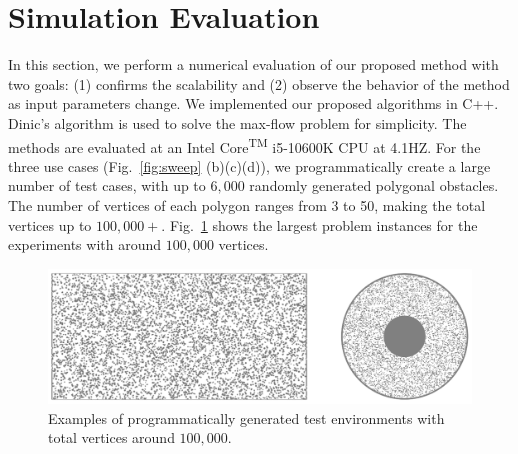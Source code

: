 \section{Simulation Evaluation}
In this section, we perform a numerical evaluation of our proposed method
with two goals: (1) confirms the scalability and (2) observe the behavior 
of the method as input parameters change. 
%
We implemented our proposed algorithms in C++. Dinic's algorithm is used to solve the max-flow problem \cite{dinitz1970algorithm} for simplicity. 
The methods are evaluated at an Intel\textsuperscript{\textregistered} Core\textsuperscript{TM} i5-10600K CPU at 4.1HZ.
%
For the three use cases (Fig.~\ref{fig:sweep} (b)(c)(d)), we
programmatically create a large number of test cases, with up to 
$6,000$ randomly generated polygonal obstacles. 
%
The number of vertices of each polygon ranges from 3 to 50, making the total vertices up to 
$100,000+$. 
%
Fig.~\ref{fig:cases} shows the largest problem instances for the experiments with 
around $100,000$ vertices.
\begin{figure}[ht]
    \centering
    \includegraphics[width=.95\linewidth]{chapters/sc/fig/cases.png}
    \caption{Examples of programmatically generated test environments with total 
    vertices around $100,000$.}
    \label{fig:cases}
\end{figure}

